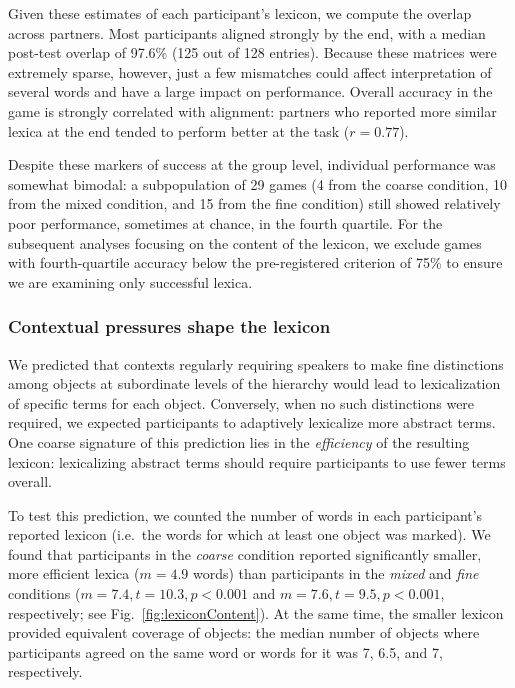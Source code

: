 \documentclass[10pt,letterpaper]{article}
\begin{document}
Given these estimates of each participant's lexicon, we compute the overlap across partners. Most participants aligned strongly by the end, with a median post-test overlap of 97.6\% (125 out of 128 entries). Because these matrices were extremely sparse, however, just a few mismatches could affect interpretation of several words and have a large impact on performance. Overall accuracy in the game is strongly correlated with alignment: partners who reported more similar lexica at the end tended to perform better at the task ($r = 0.77$).  

Despite these markers of success at the group level, individual performance was somewhat bimodal: a subpopulation of 29 games (4 from the coarse condition, 10 from the mixed condition, and 15 from the fine condition) still showed relatively poor performance, sometimes at chance, in the fourth quartile. For the subsequent analyses focusing on the content of the lexicon, we exclude games with fourth-quartile accuracy below the pre-registered criterion of 75\% to ensure we are examining only successful lexica. %

\subsubsection{Contextual pressures shape the lexicon}

We predicted that contexts regularly requiring speakers to make fine distinctions among objects at subordinate levels of the hierarchy would lead to lexicalization of specific terms for each object. Conversely, when no such distinctions were required, we expected participants to adaptively lexicalize more abstract terms. One coarse signature of this prediction lies in the \emph{efficiency} of the resulting lexicon: lexicalizing abstract terms should require participants to use fewer terms overall.

To test this prediction, we counted the number of words in each participant's reported lexicon (i.e.\ the words for which at least one object was marked). We found that participants in the \emph{coarse} condition reported significantly smaller, more efficient lexica ($m = 4.9$ words) than participants in the \emph{mixed} and \emph{fine} conditions ($m = 7.4, t = 10.3, p <0.001$ and $m = 7.6, t = 9.5, p < 0.001$, respectively; see Fig.\ \ref{fig:lexiconContent}). At the same time, the smaller lexicon provided equivalent coverage of objects: the median number of objects where participants agreed on the same word or words for it was 7, 6.5, and 7, respectively. 
\end{document}
